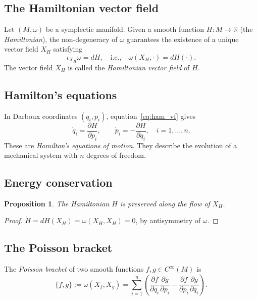 \documentclass[12pt,a4paper]{amsart}
\newtheorem{proposition}[theorem]{Proposition}
\theoremstyle{definition}
\begin{document}
\subsection{The Hamiltonian vector field}

Let $(M, \omega)$ be a symplectic manifold.  Given a smooth function
$H: M \to \mathbb{R}$ (the \emph{Hamiltonian}), the non-degeneracy of $\omega$
guarantees the existence of a unique vector field $X_H$ satisfying
\begin{equation}\label{eq:ham_vf}
  \iota_{X_H}\omega = dH, \quad \text{i.e.,} \quad
  \omega(X_H, \cdot) = dH(\cdot).
\end{equation}
The vector field $X_H$ is called the \emph{Hamiltonian vector field} of $H$.

\subsection{Hamilton's equations}

In Darboux coordinates $(q_i, p_i)$, equation~\eqref{eq:ham_vf} gives
\begin{equation}\label{eq:hamilton}
  \dot{q}_i = \frac{\partial H}{\partial p_i}, \qquad
  \dot{p}_i = -\frac{\partial H}{\partial q_i}, \quad i = 1, \ldots, n.
\end{equation}
These are \emph{Hamilton's equations of motion}.  They describe the
evolution of a mechanical system with $n$ degrees of freedom.

\subsection{Energy conservation}

\begin{proposition}
The Hamiltonian $H$ is preserved along the flow of $X_H$.
\end{proposition}
\begin{proof}
$\dot{H} = dH(X_H) = \omega(X_H, X_H) = 0$, by antisymmetry of $\omega$.
\end{proof}

\subsection{The Poisson bracket}

The \emph{Poisson bracket} of two smooth functions $f, g \in C^\infty(M)$ is
\begin{equation}\label{eq:poisson}
  \{f, g\} := \omega(X_f, X_g) = \sum_{i=1}^{n}
  \left(\frac{\partial f}{\partial q_i}\frac{\partial g}{\partial p_i}
  - \frac{\partial f}{\partial p_i}\frac{\partial g}{\partial q_i}\right).
\end{equation}
\end{document}
